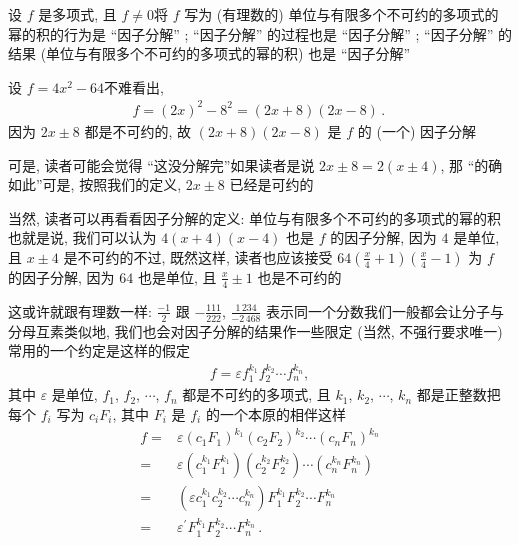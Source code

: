 \begin{definition}
    设 $f$ 是多项式, 且 $f \neq 0$\period 将 $f$ 写为 (有理数的) 单位与有限多个不可约的多项式的幂的积的行为是 ``因子分解'' ; ``因子分解'' 的过程也是 ``因子分解'' ; ``因子分解'' 的结果 (单位与有限多个不可约的多项式的幂的积) 也是 ``因子分解'' \period
\end{definition}

\begin{example}
    设 $f = 4x^2 - 64$\period 不难看出,
    \begin{align*}
        f = (2x)^2 - 8^2 = (2x + 8) (2x - 8) \period
    \end{align*}
    因为 $2x \pm 8$ 都是不可约的, 故 $(2x + 8)(2x - 8)$ 是 $f$ 的 (一个) 因子分解\period

    可是, 读者可能会觉得 ``这没分解完''\period 如果读者是说 $2x \pm 8 = 2 (x \pm 4)$, 那 ``的确如此''\period 可是, 按照我们的定义, $2x \pm 8$ 已经是可约的\period

    当然, 读者可以再看看因子分解的定义: 单位与有限多个不可约的多项式的幂的积\period 也就是说, 我们可以认为 $4 (x + 4) (x - 4)$ 也是 $f$ 的因子分解, 因为 $4$ 是单位, 且 $x \pm 4$ 是不可约的\period 不过, 既然这样, 读者也应该接受 $64 \left( \frac{x}{4} + 1 \right) \left( \frac{x}{4} - 1 \right) $ 为 $f$ 的因子分解, 因为 $64$ 也是单位, 且 $\frac{x}{4} \pm 1$ 也是不可约的\period

    这或许就跟有理数一样: $\frac{-1}{2}$ 跟 $-\frac{111}{222}$, $\frac{1\,234}{-2\,468}$ 表示同一个分数\period 我们一般都会让分子与分母互素\period 类似地, 我们也会对因子分解的结果作一些限定 (当然, 不强行要求唯一)\period 常用的一个约定是这样的\period 假定
    \begin{align*}
        f = \varepsilon f_1^{k_1} f_2^{k_2} \cdots f_n^{k_n},
    \end{align*}
    其中 $\varepsilon$ 是单位, $f_1$, $f_2$, $\cdots$, $f_n$ 都是不可约的多项式, 且 $k_1$, $k_2$, $\cdots$, $k_n$ 都是正整数\period 把每个 $f_i$ 写为 $c_i F_i$, 其中 $F_i$ 是 $f_i$ 的一个本原的相伴\period 这样
    \begin{align*}
        f
        = {} & \varepsilon (c_1 F_1)^{k_1} (c_2 F_2)^{k_2} \cdots (c_n F_n)^{k_n}                      \\
        = {} & \varepsilon (c_1^{k_1} F_1^{k_1}) (c_2^{k_2} F_2^{k_2}) \cdots (c_n^{k_n} F_n^{k_n})    \\
        = {} & (\varepsilon c_1^{k_1} c_2^{k_2} \cdots c_n^{k_n}) F_1^{k_1} F_2^{k_2} \cdots F_n^{k_n} \\
        = {} & \varepsilon^{\prime} F_1^{k_1} F_2^{k_2} \cdots F_n^{k_n} \period
    \end{align*}


\end{example}
